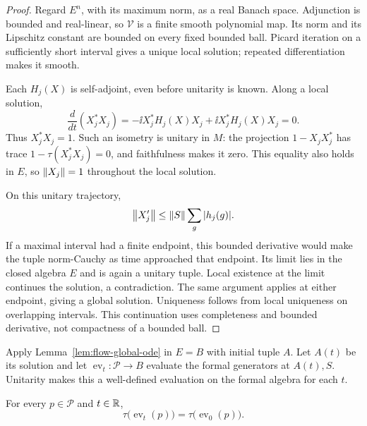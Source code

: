\begin{proof}
Regard $E^n$, with its maximum norm, as a real Banach space.
Adjunction is bounded and real-linear, so $\mathcal V$ is a
finite smooth polynomial map. Its norm and its Lipschitz constant
are bounded on every fixed bounded ball. Picard iteration on a
sufficiently short interval gives a unique local solution;
repeated differentiation makes it smooth.

Each $H_j(X)$ is self-adjoint, even before unitarity is known.
Along a local solution,
\[
 \frac{d}{dt}(X_j^*X_j)
 =-\ii X_j^*H_j(X)X_j+\ii X_j^*H_j(X)X_j=0.
\]
Thus $X_j^*X_j=1$. Such an isometry is unitary in $M$: the
projection $1-X_jX_j^*$ has trace
$1-\tau(X_j^*X_j)=0$, and faithfulness makes it zero.
This equality also holds in $E$, so $\left\lVert X_j\right\rVert=1$ throughout
the local solution.

On this unitary trajectory,
\[
 \left\lVert X_j'\right\rVert\leq \left\lVert S\right\rVert\sum_g|h_j(g)|.
\]
If a maximal interval had a finite endpoint, this bounded
derivative would make the tuple norm-Cauchy as time approached
that endpoint. Its limit lies in the closed algebra $E$ and is
again a unitary tuple. Local existence at the limit continues
the solution, a contradiction. The same argument applies at
either endpoint, giving a global solution. Uniqueness follows
from local uniqueness on overlapping intervals. This
continuation uses completeness and bounded derivative, not
compactness of a bounded ball.
\end{proof}

Apply Lemma~\ref{lem:flow-global-ode} in $E=B$ with initial
tuple $A$. Let $A(t)$ be its solution and let
$\operatorname{ev}_t:\mathcal P\to B$ evaluate the formal
generators at $A(t),S$. Unitarity makes this a well-defined
evaluation on the formal algebra for each $t$.

\begin{lemma}
\label{lem:flow-moments}
For every $p\in\mathcal P$ and $t\in\mathbb R$,
\begin{equation}
 \tau\bigl(\operatorname{ev}_t(p)\bigr)
 =\tau\bigl(\operatorname{ev}_0(p)\bigr).
 \label{eq:flow-moments}
\end{equation}
\end{lemma}

